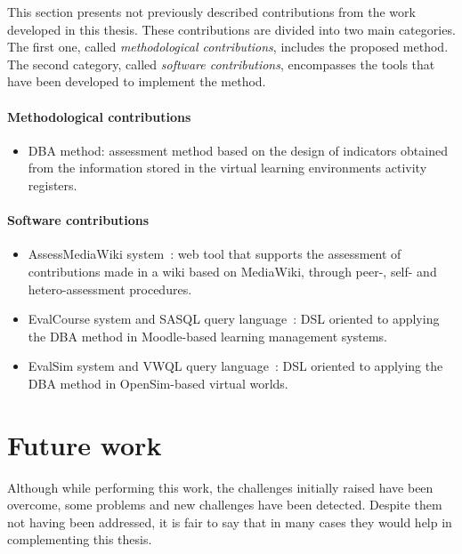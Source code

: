 	This section presents not previously described contributions from the work developed in this thesis. These contributions are divided into two main categories. The first one, called \emph{methodological contributions}, includes the proposed method. The second category, called \emph{software contributions}, encompasses the tools that have been developed to implement the method.

	\paragraph*{Methodological contributions}

	\begin{itemize}
	\item DBA method: assessment method based on the design of indicators obtained from the information stored in the virtual learning environments activity registers.
	\end{itemize}

	\paragraph*{Software contributions}

	\begin{itemize}
	\item AssessMediaWiki system~\cite{Balderas:2012}: web tool that supports the assessment of contributions made in a wiki based on MediaWiki, through peer-, self- and hetero-assessment procedures.
	\item EvalCourse system and SASQL query language~\cite{Balderas:2013,balderas2013generative,Balderas:2015}: DSL oriented to applying the DBA method in Moodle-based learning management systems.
	\item EvalSim system and VWQL query language~\cite{balderas2015domain}: DSL oriented to applying the DBA method in OpenSim-based virtual worlds.

	\end{itemize}

\section{Future work}

Although while performing this work, the challenges initially raised have been overcome, some problems and new challenges have been detected. Despite them not having been addressed, it is fair to say that in many cases they would help in complementing this thesis.

